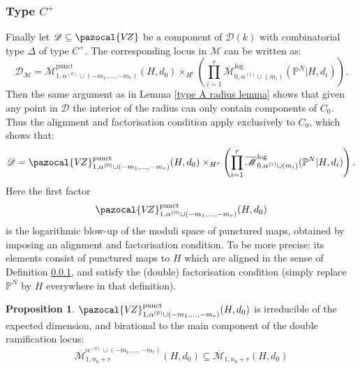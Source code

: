 \documentclass[11pt]{amsart}
\newcommand{\Mlog}[4]{\overline{\mathcal{M}}^{\operatorname{log}}_{#1,#2}(#3,#4)}
\newcommand{\Mpunct}[4]{\overline{\mathcal{M}}^{\operatorname{punct}}_{#1,#2}(#3,#4)}
\newcommand{\PP}{\mathbb P}
\newcommand{\VZ}{\pazocal{V\!Z}}
\newcommand{\Mcal}{\mathcal{M}}
\newcommand{\Dcal}{\mathcal{D}}
\newcommand{\ol}[1]{\overline{#1}}
\theoremstyle{definition}
\newtheorem{prop}[thm]{Proposition}
\theoremstyle{definition}
\begin{document}
\subsubsection{Type $C^+$} Finally let $\Dcal \subseteq \VZ$ be a component of $\Dcal(k)$ with combinatorial type $\Delta$ of type $C^+$. The corresponding locus in $\Mcal$ can be written as:
\begin{equation*} \Dcal_\Mcal = \Mpunct{1}{\alpha^{(0)}\cup(-m_1,\ldots,-m_r)}{H}{d_0} \times_{H^r} \left( \prod_{i=1}^r \Mlog{0}{\alpha^{(i)}\cup(m_i)}{\PP^N|H}{d_i} \right). \end{equation*}
Then the same argument as in Lemma \ref{type A radius lemma} shows that given any point in $\Dcal$ the interior of the radius can only contain components of $C_0$. Thus the alignment and factorisation condition apply exclusively to $C_0$, which shows that:
\begin{equation*}\Dcal = \VZ^{\operatorname{punct}}_{1,\alpha^{(0)}\cup(-m_1,\ldots,-m_r)}(H,d_0) \times_{H^r} \left( \prod_{i=1}^r \Mlog{0}{\alpha^{(i)}\cup(m_i)}{\PP^N|H}{d_i} \right). \end{equation*}
Here the first factor
\begin{equation*}\VZ^{\operatorname{punct}}_{1,\alpha^{(0)}\cup(-m_1,\ldots,-m_r)}(H,d_0) \end{equation*}
is the logarithmic blow-up of the moduli space of punctured maps, obtained by imposing an alignment and factorisation condition. To be more precise: its elements consist of punctured maps to $H$ which are aligned in the sense of Definition \ref{}, and satisfy the (double) factorisation condition (simply replace $\PP^N$ by $H$ everywhere in that definition).

\begin{prop} $\VZ^{\operatorname{punct}}_{1,\alpha^{(0)}\cup(-m_1,\ldots,-m_r)}(H,d_0)$ is irreducible of the expected dimension, and birational to the main component of the double ramification locus:
\begin{equation*} \ol{\Mcal}_{1,n_0+r}^{\alpha^{(0)}\cup(-m_1,\ldots,-m_r)}(H,d_0) \subseteq \ol{\Mcal}_{1,n_0+r}(H,d_0) \end{equation*}\end{prop}
\end{document}
